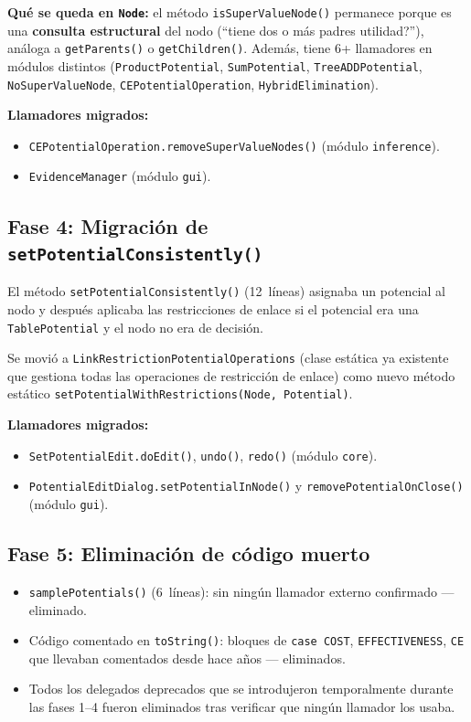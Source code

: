 \documentclass[11pt,a4paper]{article}
\newcommand{\code}[1]{\texttt{#1}}
\begin{document}
\textbf{Qu\'e se queda en \code{Node}:} el m\'etodo
\code{isSuperValueNode()} permanece porque es una \textbf{consulta
estructural} del nodo (``\textquestiondown tiene dos o m\'as padres
utilidad?''), an\'aloga a \code{getParents()} o \code{getChildren()}.
Adem\'as, tiene 6+ llamadores en m\'odulos distintos
(\code{ProductPotential}, \code{SumPotential}, \code{TreeADDPotential},
\code{NoSuperValueNode}, \code{CEPotentialOperation},
\code{HybridElimination}).

\textbf{Llamadores migrados:}
\begin{itemize}
  \item \code{CEPotentialOperation.removeSuperValueNodes()} (m\'odulo
        \code{inference}).
  \item \code{EvidenceManager} (m\'odulo \code{gui}).
\end{itemize}

\subsection{Fase 4: Migraci\'on de \code{setPotentialConsistently()}}

El m\'etodo \code{setPotentialConsistently()} (12~l\'ineas) asignaba un
potencial al nodo y despu\'es aplicaba las restricciones de enlace si
el potencial era una \code{TablePotential} y el nodo no era de decisi\'on.

Se movi\'o a \code{LinkRestrictionPotentialOperations} (clase est\'atica
ya existente que gestiona todas las operaciones de restricci\'on de
enlace) como nuevo m\'etodo est\'atico
\code{setPotentialWithRestrictions(Node, Potential)}.

\textbf{Llamadores migrados:}
\begin{itemize}
  \item \code{SetPotentialEdit.doEdit()}, \code{undo()}, \code{redo()}
        (m\'odulo \code{core}).
  \item \code{PotentialEditDialog.setPotentialInNode()} y
        \code{removePotentialOnClose()} (m\'odulo \code{gui}).
\end{itemize}

\subsection{Fase 5: Eliminaci\'on de c\'odigo muerto}

\begin{itemize}
  \item \code{samplePotentials()} (6~l\'ineas): sin ning\'un llamador
        externo confirmado --- eliminado.
  \item C\'odigo comentado en \code{toString()}: bloques de
        \code{case COST}, \code{EFFECTIVENESS}, \code{CE} que llevaban
        comentados desde hace a\~nos --- eliminados.
  \item Todos los delegados deprecados que se introdujeron
        temporalmente durante las fases 1--4 fueron eliminados tras
        verificar que ning\'un llamador los usaba.
\end{itemize}
\end{document}
